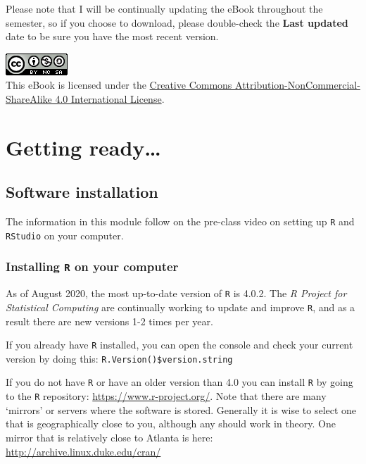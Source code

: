 \documentclass[
]{book}
\newcommand{\passthrough}[1]{#1}
\begin{document}
Please note that I will be continually updating the eBook throughout the semester, so if you choose to download, please double-check the \textbf{Last updated} date to be sure you have the most recent version.

\includegraphics{images/by-nc-sa.png}\\
This eBook is licensed under the \href{http://creativecommons.org/licenses/by-nc-sa/4.0/}{Creative Commons Attribution-NonCommercial-ShareAlike 4.0 International License}.

\hypertarget{part-getting-ready}{%
\part{Getting ready\ldots{}}\label{part-getting-ready}}

\hypertarget{software-installation}{%
\chapter*{Software installation}\label{software-installation}}

The information in this module follow on the pre-class video on setting up \passthrough{\lstinline!R!} and \passthrough{\lstinline!RStudio!} on your computer.

\hypertarget{installing-r-on-your-computer}{%
\section*{\texorpdfstring{Installing \texttt{R} on your computer}{Installing R on your computer}}\label{installing-r-on-your-computer}}

As of August 2020, the most up-to-date version of \passthrough{\lstinline!R!} is 4.0.2. The \emph{R Project for Statistical Computing} are continually working to update and improve \passthrough{\lstinline!R!}, and as a result there are new versions 1-2 times per year.

If you already have \passthrough{\lstinline!R!} installed, you can open the console and check your current version by doing this: \passthrough{\lstinline!R.Version()$version.string!}

If you do not have \passthrough{\lstinline!R!} or have an older version than 4.0 you can install \passthrough{\lstinline!R!} by going to the \passthrough{\lstinline!R!} repository: \url{https://www.r-project.org/}. Note that there are many `mirrors' or servers where the software is stored. Generally it is wise to select one that is geographically close to you, although any should work in theory. One mirror that is relatively close to Atlanta is here: \url{http://archive.linux.duke.edu/cran/}
\end{document}
